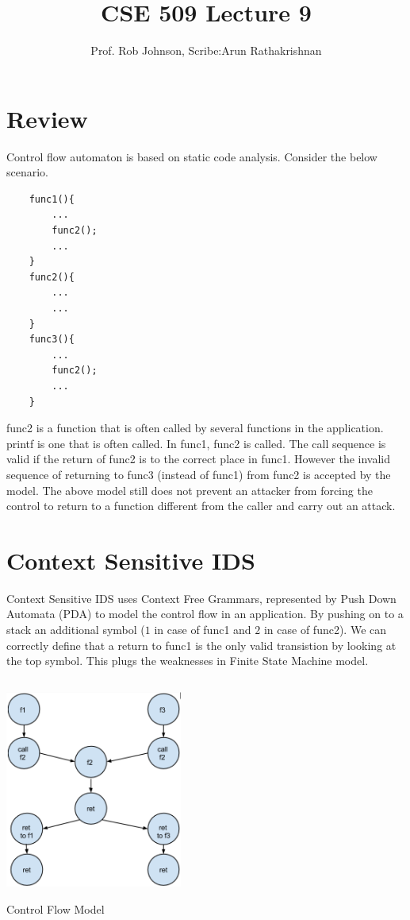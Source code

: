 \documentclass[11pt]{article} %
\title{CSE 509 Lecture 9}
\author{Prof. Rob Johnson, Scribe:Arun Rathakrishnan}
\begin{document}
\maketitle
\section {Review}
Control flow automaton is based on static code analysis. Consider the below 
scenario.  

\begin{verbatim}
    func1(){
        ...
        func2();
        ...
    }
    func2(){
        ...
        ...
    }
    func3(){
        ...
        func2();	
        ...
    }
\end{verbatim}


func2 is a function that is often called by several functions in the application.
printf is one that is often called. In func1, func2 is called. The call sequence
is valid if the return of func2 is to the correct place in func1. However the
invalid sequence of returning to func3 (instead of func1) from func2 is accepted
by the model. The above model still does not prevent an attacker from forcing the
control to return to a function different from the caller and carry out an attack.
\section {Context Sensitive IDS}
Context Sensitive IDS  uses Context Free Grammars, represented by Push Down
Automata (PDA) to model the control flow in an application. By pushing on to a
stack an additional symbol ($1$ in case of func1 and $2$ in case of func2). We can
correctly define that a return to func1 is the only valid transistion by looking
at the top symbol. This plugs the weaknesses in Finite State Machine model.

\begin {center}
\includegraphics [width=220px,height=275px]{img/img2.png}\\
\caption{Control Flow Model}
\end {center}
\end{document}

